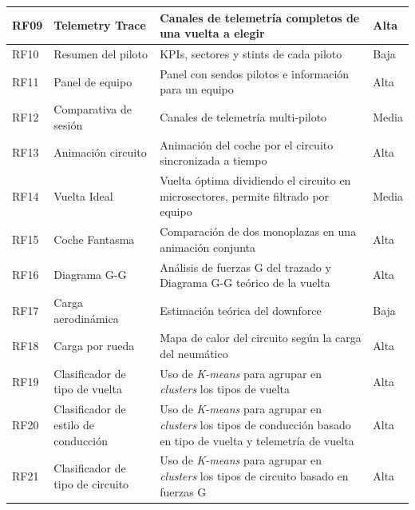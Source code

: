 \documentclass[12pt,a4paper,twoside,openright]{book}
\begin{document}
\begin{xltabular}{\textwidth}{l l X l}
    \hline
    RF09 & Telemetry Trace   & Canales de telemetría completos de una vuelta a elegir & Alta \\
    \hline
    RF10 & Resumen del piloto  & KPIs, sectores y stints de cada piloto & Baja \\
    \hline
    RF11 & Panel de equipo & Panel con sendos pilotos e información para un equipo & Alta \\
    \hline
    RF12 & Comparativa de sesión   & Canales de telemetría multi-piloto & Media \\
    \hline
    RF13 & Animación circuito   & Animación del coche por el circuito sincronizada a tiempo & Alta \\
    \hline
    RF14 & Vuelta Ideal   & Vuelta óptima dividiendo el circuito en microsectores, permite filtrado por equipo & Media \\
    \hline
    RF15 & Coche Fantasma   & Comparación de dos monoplazas en una animación conjunta & Alta \\
    \hline
    RF16 & Diagrama G-G  & Análisis de fuerzas G del trazado y Diagrama G-G teórico de la vuelta & Alta \\
    \hline
    RF17 & Carga aerodinámica   & Estimación teórica del downforce & Baja \\
    \hline
    RF18 & Carga por rueda   & Mapa de calor del circuito según la carga del neumático & Alta \\
    \hline
    RF19 & Clasificador de tipo de vuelta   & Uso de \textit{K-means} para agrupar en \textit{clusters} los tipos de vuelta & Alta \\
    \hline
    RF20 & Clasificador de estilo de conducción   & Uso de \textit{K-means} para agrupar en \textit{clusters} los tipos de conducción basado en tipo de vuelta y telemetría de vuelta & Alta \\
    \hline
    RF21 & Clasificador de tipo de circuito   & Uso de \textit{K-means} para agrupar en \textit{clusters} los tipos de circuito basado en fuerzas G & Alta \\
\end{xltabular}
\end{document}
